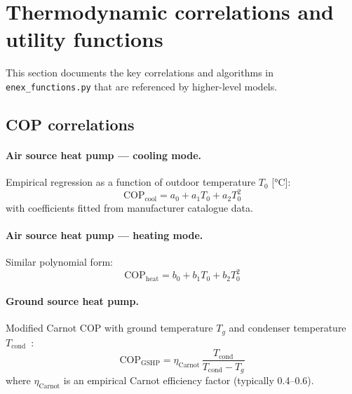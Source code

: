 \section{Thermodynamic correlations and utility functions}
\label{sec:enex-functions}

This section documents the key correlations and algorithms in \texttt{enex\_functions.py} that are referenced by higher-level models.

\subsection{COP correlations}

\paragraph{Air source heat pump --- cooling mode.}
Empirical regression as a function of outdoor temperature $T_0$ [°C]:
\begin{equation}\label{eq:cop-ashp-cool}
  \text{COP}_\text{cool} = a_0 + a_1 T_0 + a_2 T_0^2
\end{equation}
with coefficients fitted from manufacturer catalogue data.

\paragraph{Air source heat pump --- heating mode.}
Similar polynomial form:
\begin{equation}\label{eq:cop-ashp-heat}
  \text{COP}_\text{heat} = b_0 + b_1 T_0 + b_2 T_0^2
\end{equation}

\paragraph{Ground source heat pump.}
Modified Carnot COP with ground temperature $T_g$ and condenser temperature $T_\text{cond}$~\cite{sarbu2019}:
\begin{equation}\label{eq:cop-gshp}
  \text{COP}_\text{GSHP} = \eta_\text{Carnot}\,\frac{T_\text{cond}}{T_\text{cond} - T_g}
\end{equation}
where $\eta_\text{Carnot}$ is an empirical Carnot efficiency factor (typically 0.4--0.6).

